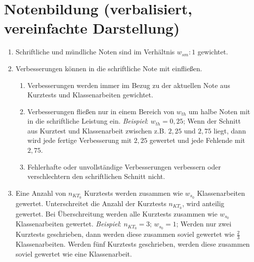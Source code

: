 \section{Notenbildung (verbalisiert, vereinfachte Darstellung)}

\begin{enumerate}[label=\textbf{\arabic*)}]
	\item Schriftliche und mündliche Noten sind im Verhältnis $w_{sm} : 1$ gewichtet.
	\item Verbesserungen können in die schriftliche Note mit einfließen.
	\begin{enumerate}[label=\textbf{(\alph*)}]
		\item Verbesserungen werden immer im Bezug zu der aktuellen Note aus Kurztests und Klassenarbeiten gewichtet.
		\item Verbesserungen fließen nur in einem Bereich von $w_{th}$ um halbe Noten mit in die schriftliche Leistung ein. \textit{Beispiel}: $w_{th}=0{,}25$; Wenn der Schnitt aus Kurztest und Klassenarbeit zwischen z.B. $2{,}25$ und $2{,}75$ liegt, dann wird jede fertige Verbesserung mit $2{,}25$ gewertet und jede Fehlende mit $2{,}75$.
		\item Fehlerhafte oder unvollständige Verbesserungen verbessern oder verschlechtern den schriftlichen Schnitt nicht.
	\end{enumerate}
	\item Eine Anzahl von $n_{KT_0}$ Kurztests werden zusammen wie $w_{s_0}$ Klassenarbeiten gewertet. Unterschreitet die Anzahl der Kurztests $n_{KT_0}$, wird anteilig gewertet. Bei Überschreitung werden alle Kurztests zusammen wie  $w_{s_0}$ Klassenarbeiten gewertet. \textit{Beispiel}:  $n_{KT_0} = 3$; $w_{s_0}=1$; Werden nur zwei Kurztests geschrieben, dann werden diese zusammen soviel gewertet wie $\frac{2}{3}$ Klassenarbeiten. Werden fünf Kurztests geschrieben, werden diese zusammen soviel gewertet wie eine Klassenarbeit.
\end{enumerate}


